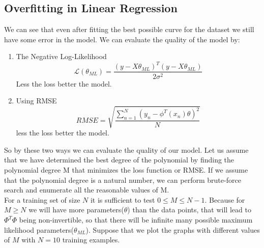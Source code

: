 \documentclass[12pt]{article}
\numberwithin{equation}{section}
\begin{document}
{\subsection{Overfitting in Linear Regression} \label{overfitting}
We can see that even after fitting the best possible curve for the dataset we still have some error in the model. We can evaluate the quality of the model by:
\begin{enumerate}
	\item The Negative Log-Likelihood
	\begin{equation*}
		\mathcal{L}(\theta_{ML}) = \frac{(y-X\theta_{ML})^T(y-X\theta_{ML})}{2\sigma^2}
	\end{equation*}
	Less the loss better the model.
	\item Using RMSE
	\begin{equation*}
		RMSE = \sqrt{\frac{\sum_{n=1}^{N}(y_{n}- \phi^T(x_{n})\theta)^2}{N}}
	\end{equation*}
	less the loss better the model.
\end{enumerate}
So by these two ways we can evaluate the quality of our model. Let us assume that we have determined the best degree of the polynomial by finding the polynomial degree M that minimizes the loss function or RMSE. If we assume that the polynomial degree is a natural number, we can perform brute-force search and enumerate all the reasonable values of M.\\
For a training set of size $N$ it is sufficient to test $0 \le M \le N-1$. Because for $M \ge N$ we will have more parameters($\theta$) than the data points, that will lead to $\Phi^T\Phi$ being non-invertible, so that there will be infinite many possible maximum likelihood parameters($\theta_{ML}$). Suppose that we plot the graphs with different values of $M$ with $N = 10$ training examples.

}
\end{document}
